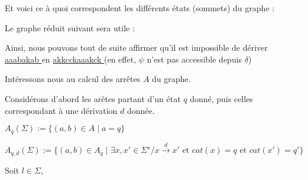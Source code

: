 \documentclass[a4paper,12pt]{article}
\begin{document}

Et voici ce à quoi correspondent les différents états (sommets) du graphe : 

 

Le graphe réduit suivant sera utile : 


Ainsi, nous pouvons tout de suite affirmer qu'il est impossible de dériver \underline{ aaabakab } en \underline{ akkcckaaakck } (en effet, $\psi$ n'est pas accessible depuis $\delta$)

Intéressons nous au calcul des arrêtes $A$ du graphe.

Considérons d'abord les arêtes partant d'un état $q$ donné, puis celles correspondant à une dérivation $d$ donnée.

$A_q(\Sigma) := \{(a,b) \in A \mid a = q\}$

$A_{q,d}(\Sigma) := \{(a,b) \in A_q \mid \exists x,x' \in \Sigma^\star / x \overset{d}{\rightarrow} x' \text{ et } cat(x) = q \text{ et } cat(x') = q'\}$

Soit $l \in \Sigma$,
\end{document}
